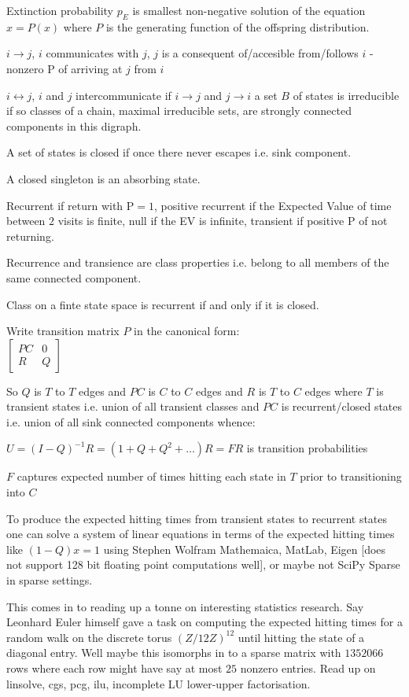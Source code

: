 Extinction probability $p_E$ is smallest non-negative solution of the equation $x=P(x)$ where $P$ is the generating function of the offspring distribution.

$i \rightarrow j$, $i$ communicates with $j$, $j$ is a consequent of/accesible from/follows $i$ - nonzero $\text{P}$ of arriving at $j$ from $i$

$i \leftrightarrow j$, $i$ and $j$ intercommunicate if $i \rightarrow j$ and $j \rightarrow i$ a set $B$ of states is irreducible if so classes of a chain, maximal irreducible sets, are strongly connected components in this digraph.

A set of states is closed if once there never escapes i.e. sink component.

A closed singleton is an absorbing state.

Recurrent if return with $\text{P}=1$, positive recurrent if the Expected Value of time between $2$ visits is finite, null if the EV is infinite, transient if positive $\text{P}$ of not returning.

Recurrence and transience are class properties i.e. belong to all members of the same connected component.

Class on a finte state space is recurrent if and only if it is closed.

Write transition matrix $P$ in the canonical form: \\
$\begin{bmatrix}
PC & 0 \\
R & Q
\end{bmatrix}$

So $Q$ is $T$ to $T$ edges and $PC$ is $C$ to $C$ edges and $R$ is $T$ to $C$ edges where $T$ is transient states i.e. union of all transient classes and $PC$ is recurrent/closed states i.e. union of all sink connected components whence:

$U=(I-Q)^{-1}R=(1+Q+Q^2+\dots)R=FR$ is transition probabilities

$F$ captures expected number of times hitting each state in $T$ prior to transitioning into $C$

To produce the expected hitting times from transient states to recurrent states one can solve a system of linear equations in terms of the expected hitting times like $(1-Q)x=1$ using Stephen Wolfram Mathemaica, MatLab, Eigen [does not support 128 bit floating point computations well], or maybe not SciPy Sparse in sparse settings.

This comes in to reading up a tonne on interesting statistics research. Say Leonhard Euler himself gave a task on computing the expected hitting times for a random walk on the discrete torus $(Z/12Z)^{12}$ until hitting the state of a diagonal entry. Well maybe this isomorphs in to a sparse matrix with $1352066$ rows where each row might have say at most $25$ nonzero entries. Read up on linsolve, cgs, pcg, ilu, incomplete LU lower-upper factorisation.

